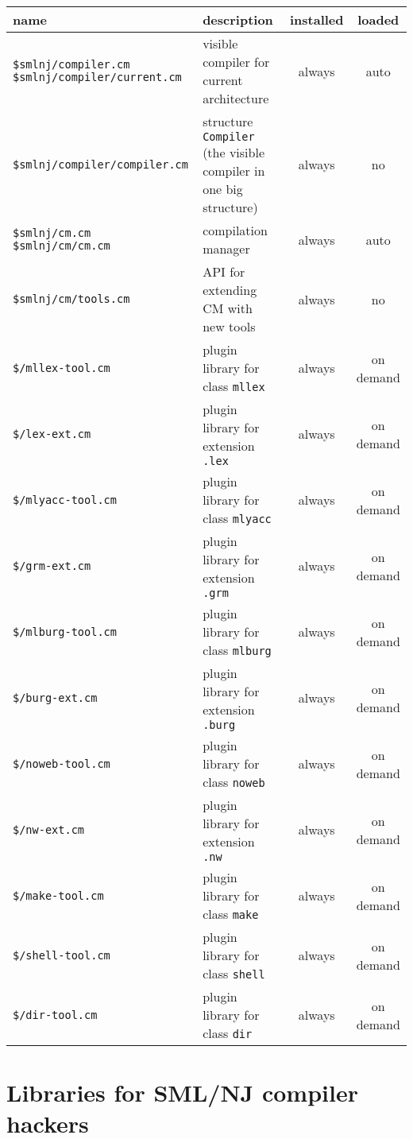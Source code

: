 \begin{small}
\begin{center}
\begin{tabular}{p{2.3in}||p{2.5in}|c|c}
name & description & installed & loaded \\
\hline\hline
{\tt \$smlnj/compiler.cm} \newline
{\tt \$smlnj/compiler/current.cm} & visible compiler for current
architecture & always & auto \\
{\tt \$smlnj/compiler/compiler.cm} & structure {\tt Compiler} (the
visible compiler in one big structure) & always & no \\
\hline\hline
{\tt \$smlnj/cm.cm} \newline
{\tt \$smlnj/cm/cm.cm} & compilation manager & always & auto \\
\hline
{\tt \$smlnj/cm/tools.cm} & API for extending CM with new tools &
always & no \\
\hline\hline
{\tt \$/mllex-tool.cm} & plugin library for class {\tt mllex} & always
& on demand \\
\hline
{\tt \$/lex-ext.cm} & plugin library for extension {\tt .lex} & always
& on demand \\
\hline
{\tt \$/mlyacc-tool.cm} & plugin library for class {\tt mlyacc} &
always & on demand \\
\hline
{\tt \$/grm-ext.cm} & plugin library for extension {\tt .grm} & always
& on demand \\
\hline
{\tt \$/mlburg-tool.cm} & plugin library for class {\tt mlburg} &
always & on demand \\
\hline
{\tt \$/burg-ext.cm} & plugin library for extension {\tt .burg} &
always & on demand \\
\hline
{\tt \$/noweb-tool.cm} & plugin library for class {\tt noweb} & always
& on demand \\
\hline
{\tt \$/nw-ext.cm} & plugin library for extension {\tt .nw} & always &
on demand \\
\hline
{\tt \$/make-tool.cm} & plugin library for class {\tt make} & always &
on demand \\
\hline
{\tt \$/shell-tool.cm} & plugin library for class {\tt shell} & always
& on demand \\
\hline
{\tt \$/dir-tool.cm} & plugin library for class {\tt dir} & always
& on demand
\end{tabular}
\end{center}
\end{small}

\section{Libraries for SML/NJ compiler hackers}

